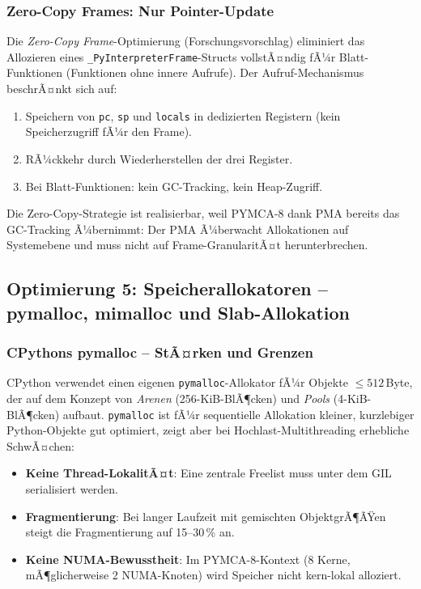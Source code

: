 ﻿\documentclass[a4paper,12pt]{scrreprt}
\theoremstyle{definition}
\begin{document}
	\subsubsection{Zero-Copy Frames: Nur Pointer-Update}
	
	Die \emph{Zero-Copy Frame}-Optimierung (Forschungsvorschlag) eliminiert
	das Allozieren eines \texttt{\_PyInterpreterFrame}-Structs vollstÃ¤ndig
	fÃ¼r Blatt-Funktionen (Funktionen ohne innere Aufrufe). Der
	Aufruf-Mechanismus beschrÃ¤nkt sich auf:
	\begin{enumerate}[noitemsep]
		\item Speichern von \texttt{pc}, \texttt{sp} und \texttt{locals} in
		dedizierten Registern (kein Speicherzugriff fÃ¼r den Frame).
		\item RÃ¼ckkehr durch Wiederherstellen der drei Register.
		\item Bei Blatt-Funktionen: kein GC-Tracking, kein Heap-Zugriff.
	\end{enumerate}
	Die Zero-Copy-Strategie ist realisierbar, weil PYMCA-8 dank PMA
	bereits das GC-Tracking Ã¼bernimmt: Der PMA Ã¼berwacht Allokationen
	auf Systemebene und muss nicht auf Frame-GranularitÃ¤t herunterbrechen.
	
	\subsection{Optimierung 5: Speicherallokatoren -- pymalloc, mimalloc und Slab-Allokation}
	
	\subsubsection{CPythons pymalloc -- StÃ¤rken und Grenzen}
	
	CPython verwendet einen eigenen \texttt{pymalloc}-Allokator fÃ¼r
	Objekte $\le 512$\,Byte, der auf dem Konzept von
	\emph{Arenen} (256-KiB-BlÃ¶cken) und \emph{Pools} (4-KiB-BlÃ¶cken)
	aufbaut. \texttt{pymalloc} ist fÃ¼r sequentielle Allokation kleiner,
	kurzlebiger Python-Objekte gut optimiert, zeigt aber bei
	Hochlast-Multithreading erhebliche SchwÃ¤chen:
	
	\begin{itemize}[noitemsep]
		\item \textbf{Keine Thread-LokalitÃ¤t}: Eine zentrale Freelist
		muss unter dem GIL serialisiert werden.
		\item \textbf{Fragmentierung}: Bei langer Laufzeit mit gemischten
		ObjektgrÃ¶ÃŸen steigt die Fragmentierung auf 15--30\,\% an.
		\item \textbf{Keine NUMA-Bewusstheit}: Im PYMCA-8-Kontext
		(8 Kerne, mÃ¶glicherweise 2 NUMA-Knoten) wird Speicher
		nicht kern-lokal alloziert.
	\end{itemize}
	
\end{document}
